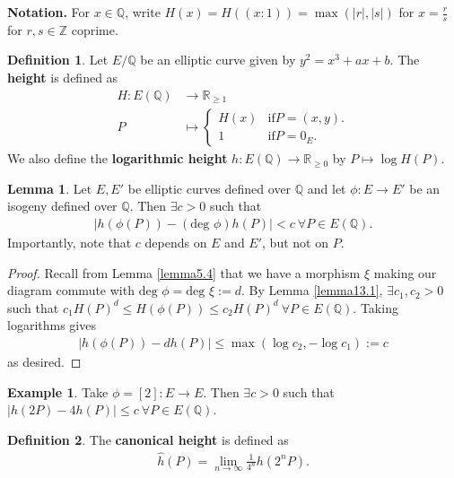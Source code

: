 \documentclass{article}
\theoremstyle{definition}
\newtheorem{lemma}[theorem]{Lemma}
\newtheorem{example}{Example}[section]
\newtheorem{defn}{Definition}[section]
\begin{document}
\textbf{Notation.} For $x \in \mathbb{Q}$, write $H(x)=H((x:1)) = \max(\left|r\right|,\left|s\right|)$ for $x=\frac{r}{s}$ for $r,s \in \mathbb{Z}$ coprime. 
\begin{defn}
    Let $E/\mathbb{Q}$ be an elliptic curve given by $y^2=x^3+ax+b$. The \textbf{height} is defined as 
    \begin{align*}
        H:E(\mathbb{Q}) &\to \mathbb{R}_{\ge 1}\\
        P &\mapsto \begin{cases}
            H(x) &\text{if} P = (x,y).\\
            1 &\text{if} P = 0_E.
        \end{cases}
    \end{align*}
    We also define the \textbf{logarithmic height} $h: E(\mathbb{Q}) \to \mathbb{R}_{\ge 0}$ by $P \mapsto \log H(P)$.
\end{defn}
\begin{lemma}\label{lemma13.2}
    Let $E,E'$ be elliptic curves defined over $\mathbb{Q}$ and let $\phi: E \to E'$ be an isogeny defined over $\mathbb{Q}$. Then $\exists c>0$ such that
    \begin{align*}
        \left|h(\phi(P))-(\text{deg }\phi)h(P)\right| < c ~\forall P \in E(\mathbb{Q}).
    \end{align*}
    Importantly, note that $c$ depends on $E$ and $E'$, but not on $P$.
\end{lemma}
\begin{proof}
    Recall from Lemma \ref{lemma5.4} that we have a morphism $\xi$ making our diagram commute with $\text{deg }\phi = \text{deg }\xi := d$. By Lemma \ref{lemma13.1}, $\exists c_1,c_2>0$ such that $c_1H(P)^d \le H(\phi(P)) \le c_2 H(P)^d ~\forall P \in E(\mathbb{Q})$. Taking logarithms gives 
    \begin{align*}
        \left|h(\phi(P))-d h(P)\right| \le \max(\log c_2, - \log c_1) := c
    \end{align*}
    as desired.
\end{proof}
\begin{example}
    Take $\phi = [2] : E \to E$. Then $\exists c>0$ such that $\left|h(2P)-4h(P)\right|\le c ~\forall P \in E(\mathbb{Q})$.
\end{example}
\begin{defn}
    The \textbf{canonical height} is defined as 
    \begin{align*}
        \widehat{h}(P) = \lim_{n \to \infty} \frac{1}{4^n} h(2^n P).
    \end{align*}
\end{defn}
\end{document}
